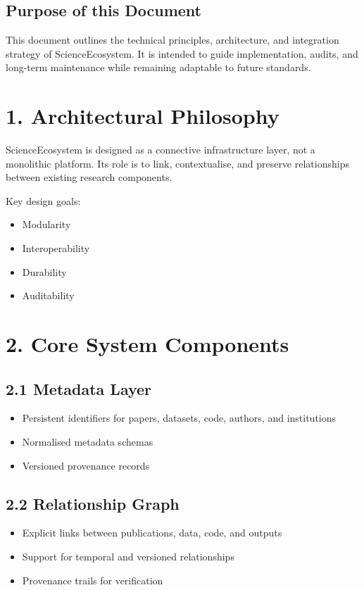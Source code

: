 \subsection*{Purpose of this Document}
This document outlines the technical principles, architecture, and integration strategy of ScienceEcosystem. It is intended to guide implementation, audits, and long-term maintenance while remaining adaptable to future standards.

\section*{1. Architectural Philosophy}

ScienceEcosystem is designed as a connective infrastructure layer, not a monolithic platform. Its role is to link, contextualise, and preserve relationships between existing research components.

Key design goals:
\begin{itemize}
    \item Modularity
    \item Interoperability
    \item Durability
    \item Auditability
\end{itemize}

\section*{2. Core System Components}

\subsection*{2.1 Metadata Layer}
\begin{itemize}
    \item Persistent identifiers for papers, datasets, code, authors, and institutions
    \item Normalised metadata schemas
    \item Versioned provenance records
\end{itemize}

\subsection*{2.2 Relationship Graph}
\begin{itemize}
    \item Explicit links between publications, data, code, and outputs
    \item Support for temporal and versioned relationships
    \item Provenance trails for verification
\end{itemize}

